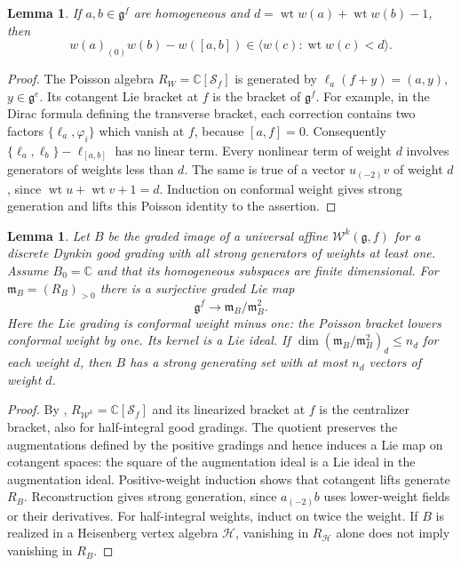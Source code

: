 \documentclass[11pt,a4paper]{amsart}
\numberwithin{equation}{section}
\newtheorem{lemma}[theorem]{Lemma}
\theoremstyle{definition}
\theoremstyle{remark}
\newcommand{\C}{\mathbb C}
\newcommand{\g}{\mathfrak g}
\newcommand{\wt}{\operatorname{wt}}
\begin{document}
\begin{lemma}\label{com:linear-bracket}
If $a,b\in\g^f$ are homogeneous and
$d=\wt w(a)+\wt w(b)-1$, then
\begin{equation}\label{com:linear-bracket-formula}
 w(a)_{(0)}w(b)-w([a,b])
 \in\langle w(c):\wt w(c)<d\rangle.
\end{equation}
\end{lemma}
\begin{proof}
The Poisson algebra $R_W=\C[\mathcal S_f]$ is generated by
$\ell_a(f+y)=(a,y)$, $y\in\g^e$. Its cotangent Lie bracket at $f$
is the bracket of $\g^f$. For example, in the Dirac formula defining
the transverse bracket, each correction contains two factors
$\{\ell_a,\varphi_i\}$ which vanish at $f$, because $[a,f]=0$.
Consequently $\{\ell_a,\ell_b\}-\ell_{[a,b]}$ has no linear term.
Every nonlinear term of weight $d$ involves generators of weights
less than $d$. The same is true of a vector $u_{(-2)}v$ of weight
$d$, since $\wt u+\wt v+1=d$. Induction on conformal weight gives
strong generation and lifts this Poisson identity to the assertion.
\end{proof}

\begin{lemma}\label{vtwo:cotangent}
Let $B$ be the graded image of a universal affine
$\mathcal W^k(\g,f)$ for a discrete Dynkin good grading with all
strong generators of weights at least one. Assume $B_0=\C$ and that its homogeneous subspaces are finite dimensional.
For $\mathfrak m_B=(R_B)_{>0}$ there is a surjective graded Lie map
$$
 \g^f\longrightarrow\mathfrak m_B/\mathfrak m_B^2.
$$
Here the Lie grading is conformal weight minus one: the Poisson
bracket lowers conformal weight by one. Its kernel is a Lie ideal. If
$\dim(\mathfrak m_B/\mathfrak m_B^2)_d\le n_d$ for each weight $d$,
then $B$ has a strong generating set with at most $n_d$ vectors of
weight $d$.
\end{lemma}
\begin{proof}
By \cite[\S3.3, Corollary 4.5.10(i)]{AAV},
$R_{\mathcal W^k}=\C[\mathcal S_f]$ and its linearized bracket at
$f$ is the centralizer bracket, also for half-integral good gradings.
The quotient preserves the augmentations defined by the positive gradings
and hence induces a Lie map on cotangent spaces: the square of the
augmentation ideal is a Lie ideal in the augmentation ideal. Positive-weight induction shows that
cotangent lifts generate $R_B$. Reconstruction gives strong generation,
since $a_{(-2)}b$ uses lower-weight fields or their derivatives.
For half-integral weights, induct on twice the weight.
If $B$ is realized in a Heisenberg vertex algebra $\mathcal H$,
vanishing in $R_{\mathcal H}$ alone does not imply vanishing in $R_B$.
\end{proof}
\end{document}
